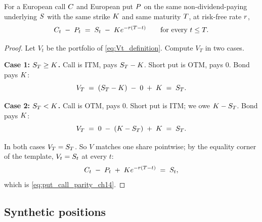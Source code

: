 \begin{theorem}
\label{thm:put_call_parity}
For a European call $C$ and European put $P$ on the same
non-dividend-paying underlying $S$ with the same strike
$K$ and same maturity $T$, at risk-free rate $r$,
\begin{equation}
  C_t \;-\; P_t \;=\; S_t \;-\; K e^{-r(T - t)}
  \qquad \text{for every } t \leq T.
  \label{eq:put_call_parity_ch14}
\end{equation}
\end{theorem}

\begin{proof}
Let $V_t$ be the portfolio of \eqref{eq:Vt_definition}. Compute
$V_T$ in two cases.

\textbf{Case 1: $S_T \geq K$.} Call is ITM, pays
$S_T - K$. Short put is OTM, pays $0$. Bond pays
$K$:
\begin{equation*}
  V_T \;=\; (S_T - K) \;-\; 0 \;+\; K
        \;=\; S_T.
\end{equation*}

\textbf{Case 2: $S_T < K$.} Call is OTM, pays $0$.
Short put is ITM; we owe $K - S_T$. Bond pays
$K$:
\begin{equation*}
  V_T \;=\; 0 \;-\; (K - S_T) \;+\; K
        \;=\; S_T.
\end{equation*}

In both cases $V_T = S_T$. So $V$ matches one share
pointwise; by the equality corner of the template,
$V_t = S_t$ at every $t$:
\begin{equation*}
  C_t \;-\; P_t \;+\; K e^{-r(T - t)}
  \;=\; S_t,
\end{equation*}
which is \eqref{eq:put_call_parity_ch14}.
\end{proof}

\subsection{Synthetic positions}
\label{sec:ch14_synthetics}

